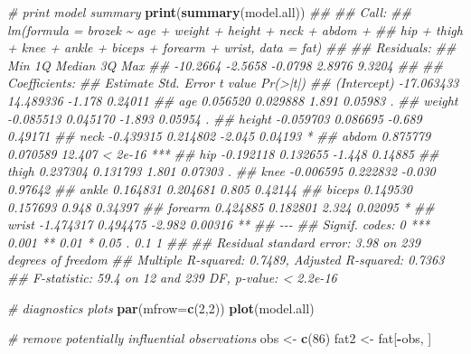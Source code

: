 \documentclass[
]{book}
\newenvironment{Shaded}{\begin{snugshade}}{\end{snugshade}}
\newcommand{\CommentTok}[1]{\textcolor[rgb]{0.56,0.35,0.01}{\textit{#1}}}
\newcommand{\DataTypeTok}[1]{\textcolor[rgb]{0.13,0.29,0.53}{#1}}
\newcommand{\DecValTok}[1]{\textcolor[rgb]{0.00,0.00,0.81}{#1}}
\newcommand{\KeywordTok}[1]{\textcolor[rgb]{0.13,0.29,0.53}{\textbf{#1}}}
\newcommand{\NormalTok}[1]{#1}
\newcommand{\OperatorTok}[1]{\textcolor[rgb]{0.81,0.36,0.00}{\textbf{#1}}}
\newcommand{\StringTok}[1]{\textcolor[rgb]{0.31,0.60,0.02}{#1}}
\theoremstyle{definition}
\theoremstyle{definition}
\theoremstyle{definition}
\theoremstyle{remark}
\begin{document}
\begin{Shaded}
\begin{Highlighting}[]
\CommentTok{\# print model summary}
\KeywordTok{print}\NormalTok{(}\KeywordTok{summary}\NormalTok{(model.all))}
\CommentTok{\#\# }
\CommentTok{\#\# Call:}
\CommentTok{\#\# lm(formula = brozek \textasciitilde{} age + weight + height + neck + abdom + }
\CommentTok{\#\#     hip + thigh + knee + ankle + biceps + forearm + wrist, data = fat)}
\CommentTok{\#\# }
\CommentTok{\#\# Residuals:}
\CommentTok{\#\#      Min       1Q   Median       3Q      Max }
\CommentTok{\#\# {-}10.2664  {-}2.5658  {-}0.0798   2.8976   9.3204 }
\CommentTok{\#\# }
\CommentTok{\#\# Coefficients:}
\CommentTok{\#\#               Estimate Std. Error t value Pr(\textgreater{}|t|)    }
\CommentTok{\#\# (Intercept) {-}17.063433  14.489336  {-}1.178  0.24011    }
\CommentTok{\#\# age           0.056520   0.029888   1.891  0.05983 .  }
\CommentTok{\#\# weight       {-}0.085513   0.045170  {-}1.893  0.05954 .  }
\CommentTok{\#\# height       {-}0.059703   0.086695  {-}0.689  0.49171    }
\CommentTok{\#\# neck         {-}0.439315   0.214802  {-}2.045  0.04193 *  }
\CommentTok{\#\# abdom         0.875779   0.070589  12.407  \textless{} 2e{-}16 ***}
\CommentTok{\#\# hip          {-}0.192118   0.132655  {-}1.448  0.14885    }
\CommentTok{\#\# thigh         0.237304   0.131793   1.801  0.07303 .  }
\CommentTok{\#\# knee         {-}0.006595   0.222832  {-}0.030  0.97642    }
\CommentTok{\#\# ankle         0.164831   0.204681   0.805  0.42144    }
\CommentTok{\#\# biceps        0.149530   0.157693   0.948  0.34397    }
\CommentTok{\#\# forearm       0.424885   0.182801   2.324  0.02095 *  }
\CommentTok{\#\# wrist        {-}1.474317   0.494475  {-}2.982  0.00316 ** }
\CommentTok{\#\# {-}{-}{-}}
\CommentTok{\#\# Signif. codes:  0 \textquotesingle{}***\textquotesingle{} 0.001 \textquotesingle{}**\textquotesingle{} 0.01 \textquotesingle{}*\textquotesingle{} 0.05 \textquotesingle{}.\textquotesingle{} 0.1 \textquotesingle{} \textquotesingle{} 1}
\CommentTok{\#\# }
\CommentTok{\#\# Residual standard error: 3.98 on 239 degrees of freedom}
\CommentTok{\#\# Multiple R{-}squared:  0.7489,	Adjusted R{-}squared:  0.7363 }
\CommentTok{\#\# F{-}statistic:  59.4 on 12 and 239 DF,  p{-}value: \textless{} 2.2e{-}16}

\CommentTok{\# diagnostics plots}
\KeywordTok{par}\NormalTok{(}\DataTypeTok{mfrow=}\KeywordTok{c}\NormalTok{(}\DecValTok{2}\NormalTok{,}\DecValTok{2}\NormalTok{))}
\KeywordTok{plot}\NormalTok{(model.all)}

\CommentTok{\# remove potentially influential observations}
\NormalTok{obs \textless{}{-}}\StringTok{ }\KeywordTok{c}\NormalTok{(}\DecValTok{86}\NormalTok{)}
\NormalTok{fat2 \textless{}{-}}\StringTok{ }\NormalTok{fat[}\OperatorTok{{-}}\NormalTok{obs, ]}


\end{Highlighting}
\end{Shaded}
\end{document}
